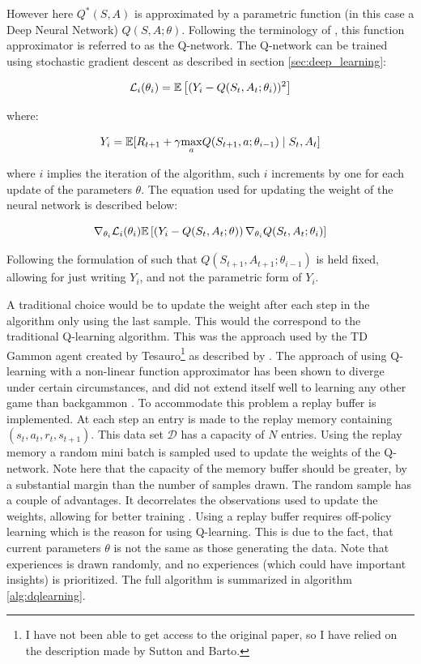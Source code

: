 However here $Q^*(S, A)$ is approximated by a parametric function (in this case a Deep Neural Network) $Q(S, A ; \theta)$. Following the terminology of \textcite{mnih_playing_2013}, this function approximator is referred to as the Q-network. The Q-network can be trained using stochastic gradient descent as described in section \ref{sec:deep_learning}:

\begin{equation}
    \mathcal{L}_i(\theta_i) = \mathbb{E} \left[ (Y_i - Q(S_t, A_t ; \theta_i))^2 \right]
\end{equation}

where:

\begin{equation}
    Y_i = \mathbb{E} [R_{t+1} + \gamma \underset{a}\max Q(S_{t+1}, a; \theta_{i-1}) \mid S_t, A_t ]
\end{equation}

where $i$ implies the iteration of the algorithm, such $i$ increments by one for each update of the parameters $\theta$. The equation used for updating the weight of the neural network is described below:

\begin{equation}
    \nabla_{\theta_i} \mathcal{L}_i (\theta_i)  \mathbb{E} \left[ \left( Y_i - Q(S_t, A_t ; \theta) \right) \nabla_{\theta_i} Q(S_t, A_t; \theta_i) \right]
\end{equation}

Following the formulation of \textcite{mnih_playing_2013} such that $Q(S_{t+1}, A_{t+1}; \theta_{i-1})$ is held fixed, allowing for just writing $Y_i$, and not the parametric form of $Y_i$.

A traditional choice would be to update the weight after each step in the algorithm only using the last sample. This would the correspond to the traditional Q-learning algorithm. This was the approach used by the TD Gammon agent created by Tesauro\footnote{I have not been able to get access to the original paper, so I have relied on the description made by Sutton and Barto.} as described by \textcite{sutton_reinforcement_2018}. The approach of using Q-learning with a non-linear function approximator has been shown to diverge under certain circumstances, and did not extend itself well to learning any other game than backgammon \parencite{tsitsiklis_analysis_1997}. To accommodate this problem a replay buffer is implemented. At each step an entry is made to the replay memory containing $(s_t, a_t, r_t, s_{t+1})$. This data set $\mathcal{D}$ has a capacity of $N$ entries. Using the replay memory a random mini batch is sampled used to update the weights of the Q-network. Note here that the capacity of the memory buffer should be greater, by a substantial margin than the number of samples drawn. The random sample has a couple of advantages. It decorrelates the observations used to update the weights, allowing for better training \textcite{mnih_playing_2013}. Using a replay buffer requires off-policy learning which is the reason for using Q-learning. This is due to the fact, that current parameters $\theta$ is not the same as those generating the data. Note that experiences is drawn randomly, and no experiences (which could have important insights) is prioritized. The full algorithm is summarized in algorithm \ref{alg:dqlearning}.

